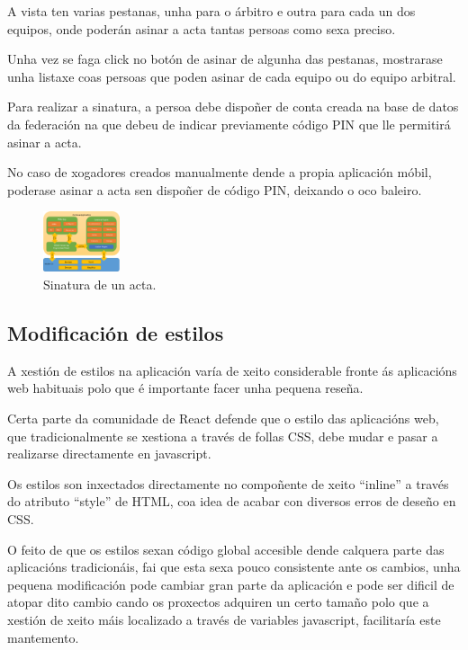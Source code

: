     A vista ten varias pestanas, unha para o árbitro e outra para cada un dos 
equipos, onde poderán asinar a acta tantas persoas como sexa preciso.

    Unha vez se faga click no botón de asinar de algunha das pestanas, 
mostrarase unha listaxe coas persoas que poden asinar de cada equipo ou do 
equipo arbitral.

    Para realizar a sinatura, a persoa debe dispoñer de conta creada na base de 
datos da federación na que debeu de indicar previamente código PIN que lle 
permitirá asinar a acta.

    No caso de xogadores creados manualmente dende a propia aplicación móbil, 
poderase asinar a acta sen dispoñer de código PIN, deixando o oco baleiro.

    \begin{figure}[h!]
      \begin{center}
      \includegraphics[width=0.2\textwidth]{./img/cordova_arquitectura.png}
      \caption{Sinatura de un acta.}
      \end{center}
    \end{figure}

    \subsection{Modificación de estilos}
    A xestión de estilos na aplicación varía de xeito considerable fronte ás 
aplicacións web habituais polo que é importante facer unha pequena reseña.

    Certa parte da comunidade de React defende que o estilo das aplicacións 
web, que tradicionalmente se xestiona a través de follas CSS, debe mudar e 
pasar a realizarse directamente en javascript.

    Os estilos son inxectados directamente no compoñente de xeito ``inline'' a 
través do atributo ``style'' de HTML, coa idea de acabar con diversos erros de 
deseño en CSS.

    O feito de que os estilos sexan código global accesible dende calquera 
parte das aplicacións tradicionáis, fai que esta sexa pouco consistente ante os 
cambios, unha pequena modificación pode cambiar gran parte da aplicación e pode 
ser dificil de atopar dito cambio cando os proxectos adquiren un certo 
tamaño polo que a xestión de xeito máis localizado a través de variables 
javascript, facilitaría este mantemento.

